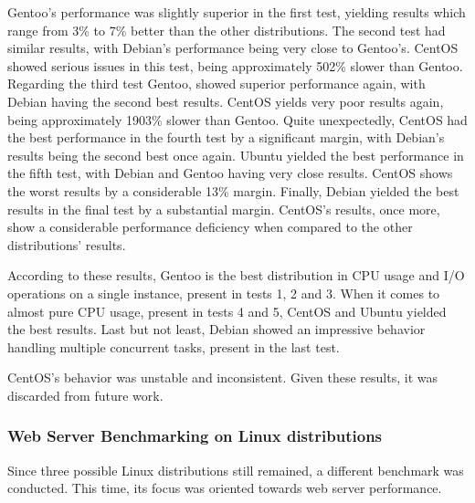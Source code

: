 Gentoo's performance was slightly superior in the first test, yielding results which range from 3\% to 7\% better than the other distributions. The second test had similar results, with Debian's performance being very close to Gentoo's. CentOS showed serious issues in this test, being approximately 502\% slower than Gentoo. Regarding the third test Gentoo, showed superior performance again, with Debian having the second best results. CentOS yields very poor results again, being approximately 1903\% slower than Gentoo. Quite unexpectedly, CentOS had the best performance in the fourth test by a significant margin, with Debian's results being the second best once again. Ubuntu yielded the best performance in the fifth test, with Debian and Gentoo having very close results. CentOS shows the worst results by a considerable 13\% margin. Finally, Debian yielded the best results in the final test by a substantial margin. CentOS's results, once more, show a considerable performance deficiency when compared to the other distributions' results.

According to these results, Gentoo is the best distribution in CPU usage and I/O operations on a single instance, present in tests 1, 2 and 3. When it comes to almost pure CPU usage, present in tests 4 and 5, CentOS and Ubuntu yielded the best results. Last but not least, Debian showed an impressive behavior handling multiple concurrent tasks, present in the last test.

CentOS's behavior was unstable and inconsistent. Given these results, it was discarded from future work.

\subsubsection{Web Server Benchmarking on Linux distributions}
Since three possible Linux distributions still remained, a different benchmark was conducted. This time, its focus was oriented towards web server performance.

